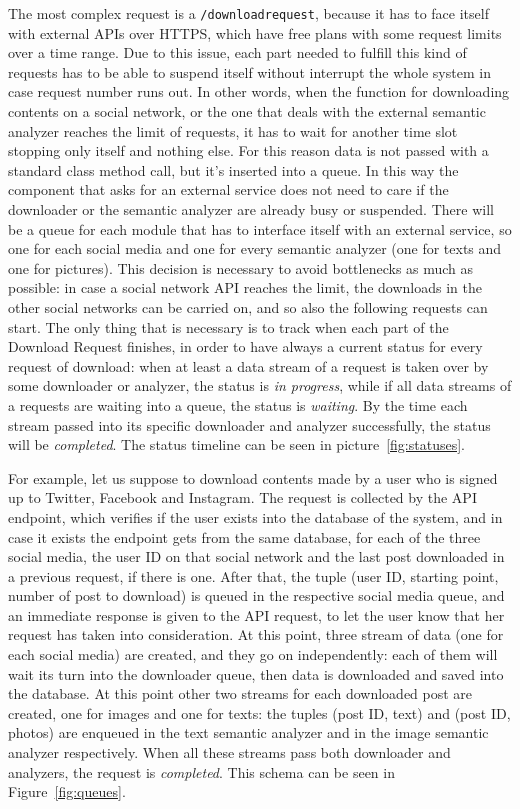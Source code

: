 The most complex request is a \texttt{/downloadrequest}, because it has to face itself with external APIs over HTTPS, which have free plans with some request limits over a time range. Due to this issue, each part needed to fulfill this kind of requests has to be able to suspend itself without interrupt the whole system in case request number runs out. In other words, when the function for downloading contents on a social network, or the one that deals with the external semantic analyzer reaches the limit of requests, it has to wait for another time slot stopping only itself and nothing else. For this reason data is not passed with a standard class method call, but it's inserted into a queue. In this way the component that asks for an external service does not need to care if the downloader or the semantic analyzer are already busy or suspended. There will be a queue for each module that has to interface itself with an external service, so one for each social media and one for every semantic analyzer (one for texts and one for pictures). This decision is necessary to avoid bottlenecks as much as possible: in case a social network API reaches the limit, the downloads in the other social networks can be carried on, and so also the following requests can start. The only thing that is necessary is to track when each part of the Download Request finishes, in order to have always a current status for every request of download: when at least a data stream of a request is taken over by some downloader or analyzer, the status is \emph{in progress}, while if all data streams of a requests are waiting into a queue, the status is \emph{waiting}. By the time each stream passed into its specific downloader and analyzer successfully, the status will be \emph{completed}. The status timeline can be seen in picture~\ref{fig:statuses}.

For example, let us suppose to download contents made by a user who is signed up to Twitter, Facebook and Instagram. The request is collected by the API endpoint, which verifies if the user exists into the database of the system, and in case it exists the endpoint gets from the same database, for each of the three social media, the user ID on that social network and the last post downloaded in a previous request, if there is one. After that, the tuple (user ID, starting point, number of post to download) is queued in the respective social media queue, and an immediate response is given to the API request, to let the user know that her request has taken into consideration. At this point, three stream of data (one for each social media) are created, and they go on independently: each of them will wait its turn into the downloader queue, then data is downloaded and saved into the database. At this point other two streams for each downloaded post are created, one for images and one for texts: the tuples (post ID, text) and (post ID, photos) are enqueued in the text semantic analyzer and in the image semantic analyzer respectively. When all these streams pass both downloader and analyzers, the request is \emph{completed}. This schema can be seen in Figure~\ref{fig:queues}.

